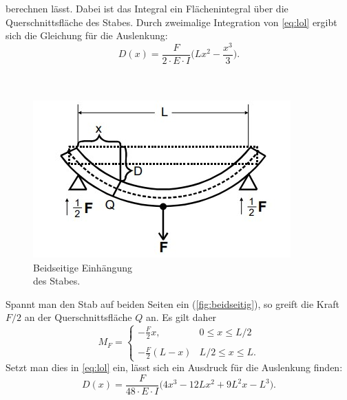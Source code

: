 berechnen lässt. Dabei ist das Integral ein Flächenintegral über die Querschnittsfläche des Stabes.
Durch zweimalige Integration von \autoref{eq:lol} ergibt sich die Gleichung für die Auslenkung:
\begin{equation*}
    D(x) = \frac{F}{2 \cdot E \cdot I} \biggl(Lx^2 - \frac{x^3}{3}\biggr).
\end{equation*}
\\
\\
\begin{minipage}[4cm]{0.45\textwidth}
    \begin{figure}[H]
        \includegraphics[width=\linewidth]{img/abb4.jpg}
        \caption{Beidseitige Einhängung \\des Stabes.}
        \label{fig:beidseitig}
    \end{figure}
    \vspace{10pt}
    \end{minipage}
    \begin{minipage}[4cm]{0.55\textwidth}
        Spannt man den Stab auf beiden Seiten ein (\autoref{fig:beidseitig}), so greift die Kraft $F/2$ an der Querschnittsfläche $Q$ an.
        Es gilt daher
        \begin{equation*}
            M_F = 
            \begin{cases}
                -\frac{F}{2}x, & 0 \leq x \leq L/2 \\
                \\
                -\frac{F}{2}(L-x) & L/2 \leq x \leq L.
            \end{cases}
        \end{equation*}
        Setzt man dies in \autoref{eq:lol} ein, lässt sich ein Ausdruck für die Auslenkung finden:
        \begin{equation*}
            D(x) = \frac{F}{48 \cdot E \cdot I} \biggl(4x^3 - 12Lx^2 + 9L^2x - L^3\biggr).
        \end{equation*}
        \vspace{10pt}
    \end{minipage}